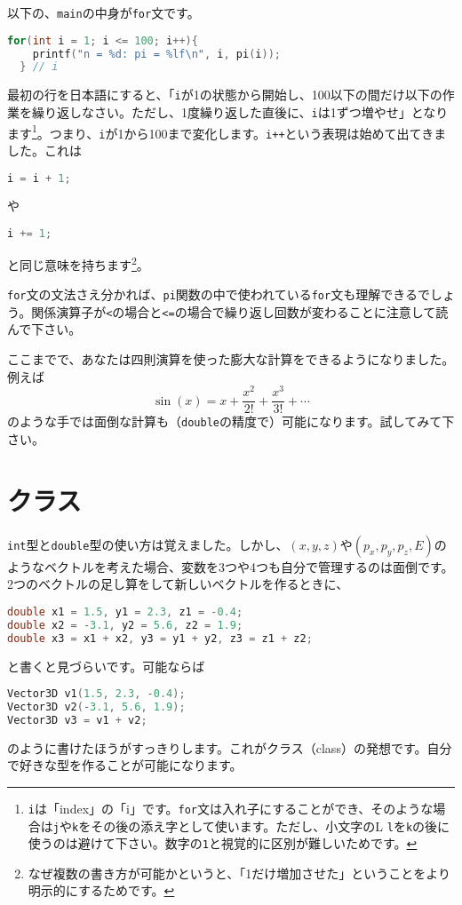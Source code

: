 以下の、\texttt{main}の中身が\texttt{for}文です。
\begin{lstlisting}[language=c++]
  for(int i = 1; i <= 100; i++){ 
    printf("n = %d: pi = %lf\n", i, pi(i)); 
  } // i 
\end{lstlisting}
最初の行を日本語にすると、「\texttt{i}が1の状態から開始し、100以下の間だけ以下の作業を繰り返しなさい。ただし、1度繰り返した直後に、\texttt{i}は1ずつ増やせ」となります\footnote{\texttt{i}は「index」の「i」です。\texttt{for}文は入れ子にすることができ、そのような場合は\texttt{j}や\texttt{k}をその後の添え字として使います。ただし、小文字のL \texttt{l}を\texttt{k}の後に使うのは避けて下さい。数字の\texttt{1}と視覚的に区別が難しいためです。}。つまり、\texttt{i}が1から100まで変化します。\texttt{i++}という表現は始めて出てきました。これは
\begin{lstlisting}[language=c++]
i = i + 1;
\end{lstlisting}
や
\begin{lstlisting}[language=c++]
i += 1;
\end{lstlisting}
と同じ意味を持ちます\footnote{なぜ複数の書き方が可能かというと、「1だけ増加させた」ということをより明示的にするためです。}。

\texttt{for}文の文法さえ分かれば、\texttt{pi}関数の中で使われている\texttt{for}文も理解できるでしょう。関係演算子が\texttt{<}の場合と\texttt{<=}の場合で繰り返し回数が変わることに注意して読んで下さい。

ここまでで、あなたは四則演算を使った膨大な計算をできるようになりました。例えば
\begin{equation}
\sin(x) = x + \frac{x^2}{2!} + \frac{x^3}{3!} + \cdots
\end{equation}
のような手では面倒な計算も（\texttt{double}の精度で）可能になります。試してみて下さい。

\clearpage

\section{クラス}
\texttt{int}型と\texttt{double}型の使い方は覚えました。しかし、$(x, y, z)$や$(p_x, p_y, p_z, E)$のようなベクトルを考えた場合、変数を3つや4つも自分で管理するのは面倒です。2つのベクトルの足し算をして新しいベクトルを作るときに、
\begin{lstlisting}[language=c++]
double x1 = 1.5, y1 = 2.3, z1 = -0.4;
double x2 = -3.1, y2 = 5.6, z2 = 1.9;
double x3 = x1 + x2, y3 = y1 + y2, z3 = z1 + z2;
\end{lstlisting}
と書くと見づらいです。可能ならば
\begin{lstlisting}[language=c++]
Vector3D v1(1.5, 2.3, -0.4);
Vector3D v2(-3.1, 5.6, 1.9);
Vector3D v3 = v1 + v2;
\end{lstlisting}
のように書けたほうがすっきりします。これがクラス（class）の発想です。自分で好きな型を作ることが可能になります。

